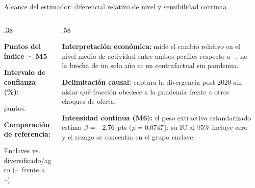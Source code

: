 \documentclass[aspectratio=169,11pt]{beamer}
\begin{document}
\begin{frame}[t]{Alcance del estimador: diferencial relativo de nivel y sensibilidad continua}
\vspace{.10cm}
\begin{columns}[T,onlytextwidth]
\begin{column}{.38\textwidth}
\begin{keybox}[equal height group=g13]
\textcolor{warn}{\fontsize{28}{31}\selectfont\bfseries \ScarBeta}\par\vspace{.08cm}
\textbf{Puntos del índice · M5}\par\medskip
\footnotesize
\textbf{Intervalo de confianza (\ConfidencePct\%):}\par
[\ScarLow, \ScarHigh] puntos.\par\medskip
\textbf{Comparación de referencia:}\par
Enclaves vs. diversificado/agro (\PostStart--\PostEnd\ frente a \LevelStart--\PreEnd).
\end{keybox}
\end{column}
\begin{column}{.58\textwidth}
\begin{keybox}[equal height group=g13]
\textbf{Interpretación económica:} mide el cambio relativo en el nivel medio de actividad entre ambos perfiles respecto a \LevelStart--\PreEnd, no la brecha de un solo año ni un contrafactual sin pandemia.\par\smallskip
\textbf{Delimitación causal:} captura la divergencia post-2020 sin aislar qué fracción obedece a la pandemia frente a otros choques de oferta.\par\smallskip
\textbf{Intensidad continua (M6):} el peso extractivo estandarizado estima $\beta = -2.76$ pts ($p=0.0747$); su IC al 95\% incluye cero y el rezago se concentra en el grupo enclave.
\end{keybox}
\end{column}
\end{columns}
\end{frame}
\end{document}
